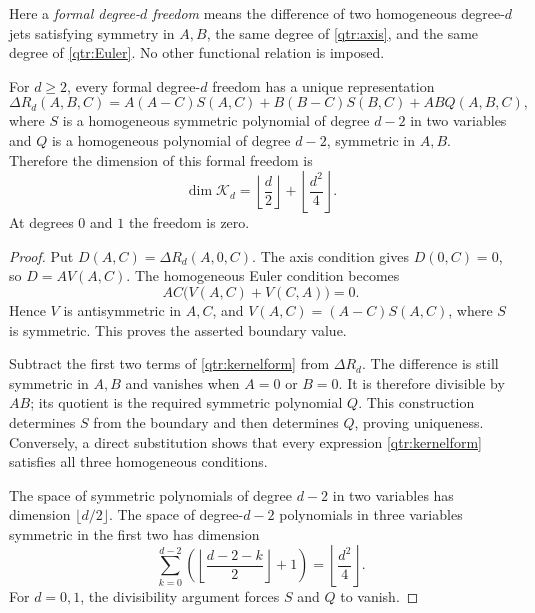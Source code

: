 Here a \emph{formal degree-\(d\) freedom} means the difference of
two homogeneous degree-\(d\) jets satisfying symmetry in \(A,B\),
the same degree of \eqref{qtr:axis}, and the same degree of
\eqref{qtr:Euler}. No other functional relation is imposed.

\begin{theorem}\label{qtr:kernel}
For \(d\ge2\), every formal degree-\(d\) freedom has a unique
representation
\begin{equation}\label{qtr:kernelform}
 \Delta R_d(A,B,C)=
 A(A-C)S(A,C)+B(B-C)S(B,C)+ABQ(A,B,C),
\end{equation}
where \(S\) is a homogeneous symmetric polynomial of degree
\(d-2\) in two variables and \(Q\) is a homogeneous polynomial of
degree \(d-2\), symmetric in \(A,B\). Therefore the dimension of
this formal freedom is
\begin{equation}\label{qtr:dimension}
 \dim\mathcal K_d
 =\left\lfloor\frac d2\right\rfloor
     +\left\lfloor\frac{d^2}{4}\right\rfloor.
\end{equation}
At degrees \(0\) and \(1\) the freedom is zero.
\end{theorem}

\begin{proof}
Put \(D(A,C)=\Delta R_d(A,0,C)\). The axis condition gives
\(D(0,C)=0\), so \(D=A V(A,C)\). The homogeneous Euler
condition becomes
\[
 AC\bigl(V(A,C)+V(C,A)\bigr)=0.
\]
Hence \(V\) is antisymmetric in \(A,C\), and
\(V(A,C)=(A-C)S(A,C)\), where \(S\) is symmetric.
This proves the asserted boundary value.

Subtract the first two terms of \eqref{qtr:kernelform} from
\(\Delta R_d\). The difference is still symmetric in \(A,B\)
and vanishes when \(A=0\) or \(B=0\). It is therefore divisible
by \(AB\); its quotient is the required symmetric polynomial
\(Q\). This construction determines \(S\) from the boundary
and then determines \(Q\), proving uniqueness. Conversely, a
direct substitution shows that every expression
\eqref{qtr:kernelform} satisfies all three homogeneous
conditions.

The space of symmetric polynomials of degree \(d-2\) in two
variables has dimension \(\lfloor d/2\rfloor\). The space
of degree-\(d-2\) polynomials in three variables symmetric
in the first two has dimension
\[
 \sum_{k=0}^{d-2}
 \left(\left\lfloor\frac{d-2-k}{2}\right\rfloor+1\right)
 =\left\lfloor\frac{d^2}{4}\right\rfloor.
\]
For \(d=0,1\), the divisibility argument forces \(S\) and \(Q\)
to vanish.
\end{proof}

